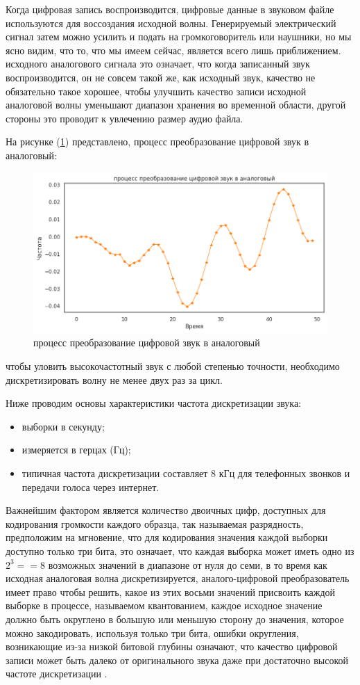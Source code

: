 Когда цифровая запись воспроизводится, цифровые данные в звуковом файле используются для воссоздания исходной волны. Генерируемый электрический сигнал затем можно усилить и подать на громкоговоритель или наушники, но мы ясно видим, что то, что мы имеем сейчас, является всего лишь приближением. исходного аналогового сигнала это означает, что когда записанный звук воспроизводится, он не совсем такой же, как исходный звук, качество не обязательно такое хорошее, чтобы улучшить качество записи исходной аналоговой волны уменьшают диапазон хранения во временной области, другой стороны это проводит к увлечению размер аудио файла.

На рисунке (\ref{fig:ampl_and_time}) представлено, процесс преобразование цифровой звук в аналоговый: 
\begin{figure}[H]
	\centering
	\includegraphics[width=0.8\linewidth]{images/regenration_of_audio.png}
	\caption{процесс преобразование цифровой звук в аналоговый}
	\label{fig:ampl_and_time}
\end{figure}

чтобы уловить высокочастотный звук с любой степенью точности, необходимо дискретизировать волну не менее двух раз за цикл.

Ниже проводим основы характеристики частота дискретизации звука:

\begin{itemize}
    \item выборки в секунду;
    \item измеряется в герцах (Гц);
    \item типичная частота дискретизации составляет 8 кГц для телефонных звонков и передачи голоса через интернет.
\end{itemize}

Важнейшим фактором является количество двоичных цифр, доступных для кодирования громкости каждого образца, так называемая разрядность, предположим на мгновение, что для кодирования значения каждой выборки доступно только три бита, это означает, что каждая выборка может иметь одно из $2^{3} == 8$ возможных значений в диапазоне от нуля до семи, в то время как исходная аналоговая волна дискретизируется, аналого-цифровой преобразователь имеет право чтобы решить, какое из этих восьми значений присвоить каждой выборке в процессе, называемом квантованием, каждое исходное значение должно быть округлено в большую или меньшую сторону до значения, которое можно закодировать, используя только три бита, ошибки округления, возникающие из-за низкой битовой глубины означают, что качество цифровой записи может быть далеко от оригинального звука даже при достаточно высокой частоте дискретизации \cite{liu2023simple}.

